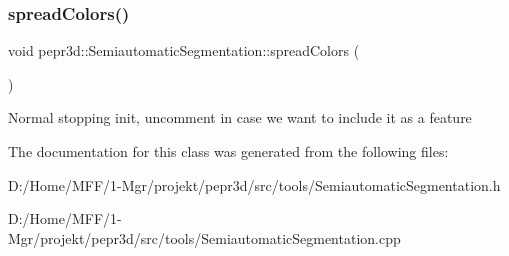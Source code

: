 \subsubsection{\texorpdfstring{spreadColors()}{spreadColors()}}
{\footnotesize\ttfamily void pepr3d\+::\+Semiautomatic\+Segmentation\+::spread\+Colors (\begin{DoxyParamCaption}{ }\end{DoxyParamCaption})\hspace{0.3cm}{\ttfamily [private]}}

Normal stopping init, uncomment in case we want to include it as a feature 

The documentation for this class was generated from the following files\+:\begin{DoxyCompactItemize}
\item 
D\+:/\+Home/\+M\+F\+F/1-\/\+Mgr/projekt/pepr3d/src/tools/Semiautomatic\+Segmentation.\+h\item 
D\+:/\+Home/\+M\+F\+F/1-\/\+Mgr/projekt/pepr3d/src/tools/Semiautomatic\+Segmentation.\+cpp\end{DoxyCompactItemize}
